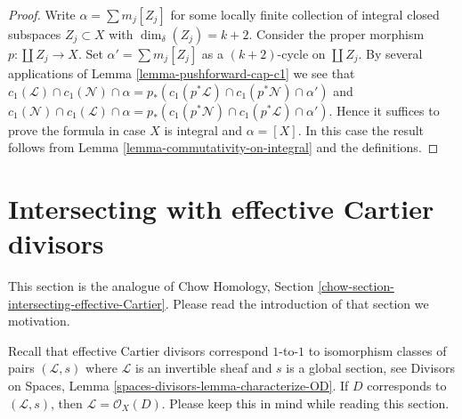 \begin{proof}
Write $\alpha = \sum m_j[Z_j]$ for some locally finite
collection of integral closed subspaces $Z_j \subset X$
with $\dim_\delta(Z_j) = k + 2$.
Consider the proper morphism $p : \coprod Z_j \to X$.
Set $\alpha' = \sum m_j[Z_j]$ as a $(k + 2)$-cycle on
$\coprod Z_j$. By several applications of
Lemma \ref{lemma-pushforward-cap-c1} we see that
$c_1(\mathcal{L}) \cap c_1(\mathcal{N}) \cap \alpha
= p_*(c_1(p^*\mathcal{L}) \cap c_1(p^*\mathcal{N}) \cap \alpha')$
and
$c_1(\mathcal{N}) \cap c_1(\mathcal{L}) \cap \alpha
= p_*(c_1(p^*\mathcal{N}) \cap c_1(p^*\mathcal{L}) \cap \alpha')$.
Hence it suffices to prove the formula in case $X$ is integral
and $\alpha = [X]$. In this case the result follows
from Lemma \ref{lemma-commutativity-on-integral} and the definitions.
\end{proof}

















\section{Intersecting with effective Cartier divisors}
\label{section-intersecting-effective-Cartier}

\noindent
This section is the analogue of
Chow Homology, Section \ref{chow-section-intersecting-effective-Cartier}.
Please read the introduction of that section we motivation.

\medskip\noindent
Recall that effective Cartier divisors correspond $1$-to-$1$ to
isomorphism classes of pairs $(\mathcal{L}, s)$ where $\mathcal{L}$
is an invertible sheaf and $s$ is a global section, see
Divisors on Spaces, Lemma \ref{spaces-divisors-lemma-characterize-OD}.
If $D$ corresponds to $(\mathcal{L}, s)$, then
$\mathcal{L} = \mathcal{O}_X(D)$. Please keep this in mind while
reading this section.

